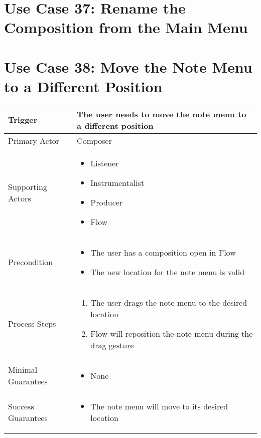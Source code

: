 
  \section{Use Case 37: Rename the Composition from the Main Menu}


  \section{Use Case 38: Move the Note Menu to a Different Position}

  \begin{tabularx}{\textwidth}{|X|X|}
  \hline
  Trigger & 
  The user needs to move the note menu to a different position\\
  \hline
  Primary Actor & 
  Composer \\
  \hline
  Supporting Actors & 
  \begin{itemize}
  \item Listener
  \item Instrumentalist
  \item Producer
  \item Flow
  \end{itemize} \\
  \hline
  Precondition & 
  \begin{itemize}
  \item The user has a composition open in Flow
  \item The new location for the note menu is valid
  \end{itemize} \\
  \hline
  Process Steps & 
  \begin{enumerate}
  \item The user drags the note menu to the desired location
  \item Flow will reposition the note menu during the drag gesture
  \end{enumerate} \\
  \hline
  Minimal Guarantees & 
  \begin{itemize}
    \item None
  \end{itemize} \\
  \hline
  Success Guarantees & 
  \begin{itemize}
    \item The note menu will move to its desired location
  \end{itemize} \\
  \hline
  \end{tabularx}

